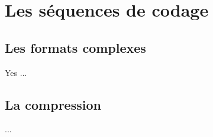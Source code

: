 \section{Les séquences de codage}
\subsection{Les formats complexes}
\begin{frame}{Yes}
...
\end{frame}
\subsection{La compression}
\begin{frame}
...
\end{frame}

